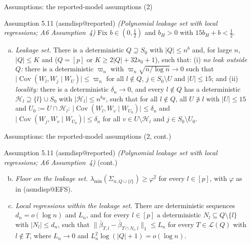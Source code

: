 \documentclass[aspectratio=169]{beamer}
\makeatletter
\newcommand{\asmdisp}[1]{\csname asmdisp@#1\endcsname}
\newcommand{\as}[1]{\textup{(\asmdisp{#1})}}
\newcommand{\set}[1]{[#1]}
\newcommand{\abs}[1]{\lvert #1\rvert}
\newcommand{\norm}[1]{\lVert #1\rVert}
\DeclareMathOperator{\Cov}{Cov}
\newcommand{\lmin}{\lambda_{\min}}
\newcommand{\Sz}{S_0}
\newcommand{\sz}{s_0}
\newcommand{\Hl}{\mathcal H}
\newcommand{\Lat}{\mathcal L}
\makeatother
\begin{document}
\begin{frame}{Assumptions: the reported-model assumptions (2)}
\small
\begin{block}{Assumption 5.11 (\asmdisp{reported}) \textit{(Polynomial leakage set with local regressions; A6 Assumption~4)}}
Fix $b\in(0,\tfrac12)$ and $b_H>0$ with $15b_H+b<\tfrac12$.
\begin{enumerate}[(a)]
  \item \emph{Leakage set.} There is a deterministic $Q\supseteq\Sz$ with $\abs{Q}\le n^b$ and, for
    large $n$, $\abs{Q}\le K$ and ($Q=\set{p}$ or $K\ge2\abs{Q}+32\sz+1$), such that: (i) \emph{no leak outside $Q$:}
    there is a deterministic $\varpi_n$ with $\varpi_n\sqrt{n/\log n}\to0$ such that
    $\abs{\Cov(W_l,W_j\mid W_U)}\le\varpi_n$ for all $l\notin Q$, $j\in\Sz\setminus U$ and $\abs{U}\le15$; and (ii)
    \emph{locality:} there is a deterministic $\delta_n\to0$, and every $l\notin Q$ has a deterministic
    $\Hl_l\supseteq\{l\}\cup\Sz$ with $\abs{\Hl_l}\le n^{b_H}$, such that for all $l\notin Q$, all $U\not\ni l$ with
    $\abs{U}\le15$ and $U_0:=U\cap\Hl_l$: $\abs{\Cov(W_l,W_v\mid W_{U_0})}\le\delta_n$ and
    $\abs{\Cov(W_j,W_v\mid W_{U_0})}\le\delta_n$ for all $v\in U\setminus\Hl_l$ and $j\in\Sz\setminus U_0$.
\end{enumerate}
\end{block}
\end{frame}

\begin{frame}{Assumptions: the reported-model assumptions (2, cont.)}
\small
\begin{block}{Assumption 5.11 (\asmdisp{reported}) \textit{(Polynomial leakage set with local regressions; A6 Assumption~4)} (cont.)}
\begin{enumerate}[(a)]\setcounter{enumi}{1}
  \item \emph{Floor on the leakage set.} $\lmin(\Sigma_{n,Q\cup\{l\}})\ge\varphi^2$ for every
    $l\in\set{p}$, with $\varphi$ as in \as{EFS}.
  \item \emph{Local regressions within the leakage set.} There are deterministic sequences
    $d_n=o(\log n)$ and $L_n$, and for every $l\in\set{p}$ a deterministic $N_l\subseteq Q\setminus\{l\}$ with
    $\abs{N_l}\le d_n$, such that $\norm{\bar\beta_{T,l}-\bar\beta_{T\cap N_l,l}}_1\le L_n$ for every $T\in\Lat(Q)$ with
    $l\notin T$, where $L_n\to0$ and $L_n^2\log(\abs{Q}+1)=o(\log n)$.
\end{enumerate}
\end{block}
\end{frame}
\end{document}
